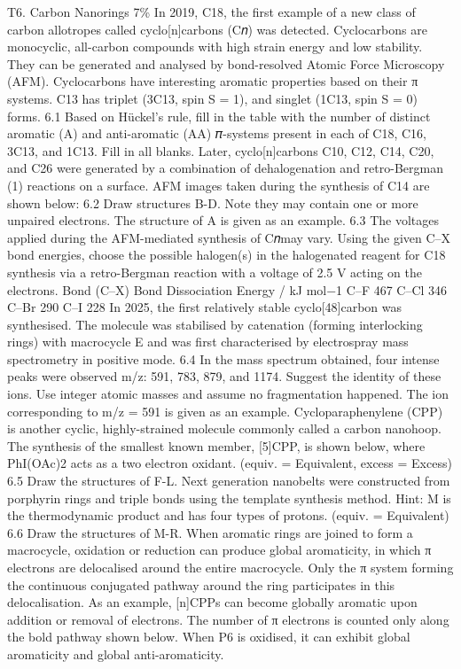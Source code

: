 T6. Carbon Nanorings 7\% In 2019, C18, the first example of a new class of carbon allotropes called cyclo[n]carbons (C𝑛) was detected. Cyclocarbons are monocyclic, all-carbon compounds with high strain energy and low stability. They can be generated and analysed by bond-resolved Atomic Force Microscopy (AFM). Cyclocarbons have interesting aromatic properties based on their π systems. C13 has triplet (3C13, spin S = 1), and singlet (1C13, spin S = 0) forms. 6.1 Based on Hückel’s rule, fill in the table with the number of distinct aromatic (A) and anti-aromatic (AA) 𝜋-systems present in each of C18, C16, 3C13, and 1C13. Fill in all blanks. Later, cyclo[n]carbons C10, C12, C14, C20, and C26 were generated by a combination of dehalogenation and retro-Bergman (1) reactions on a surface. AFM images taken during the synthesis of C14 are shown below: 6.2 Draw structures B-D. Note they may contain one or more unpaired electrons. The structure of A is given as an example. 6.3 The voltages applied during the AFM-mediated synthesis of C𝑛may vary. Using the given C–X bond energies, choose the possible halogen(s) in the halogenated reagent for C18 synthesis via a retro-Bergman reaction with a voltage of 2.5 V acting on the electrons. Bond (C–X) Bond Dissociation Energy / kJ mol−1 C–F 467 C–Cl 346 C–Br 290 C–I 228 In 2025, the first relatively stable cyclo[48]carbon was synthesised. The molecule was stabilised by catenation (forming interlocking rings) with macrocycle E and was first characterised by electrospray mass spectrometry in positive mode. 6.4 In the mass spectrum obtained, four intense peaks were observed m/z: 591, 783, 879, and 1174. Suggest the identity of these ions. Use integer atomic masses and assume no fragmentation happened. The ion corresponding to m/z = 591 is given as an example. Cycloparaphenylene (CPP) is another cyclic, highly-strained molecule commonly called a carbon nanohoop. The synthesis of the smallest known member, [5]CPP, is shown below, where PhI(OAc)2 acts as a two electron oxidant. (equiv. = Equivalent, excess = Excess) 6.5 Draw the structures of F-L. Next generation nanobelts were constructed from porphyrin rings and triple bonds using the template synthesis method. Hint: M is the thermodynamic product and has four types of protons. (equiv. = Equivalent) 6.6 Draw the structures of M-R. When aromatic rings are joined to form a macrocycle, oxidation or reduction can produce global aromaticity, in which π electrons are delocalised around the entire macrocycle. Only the π system forming the continuous conjugated pathway around the ring participates in this delocalisation. As an example, [n]CPPs can become globally aromatic upon addition or removal of electrons. The number of π electrons is counted only along the bold pathway shown below. When P6 is oxidised, it can exhibit global aromaticity and global anti-aromaticity.

